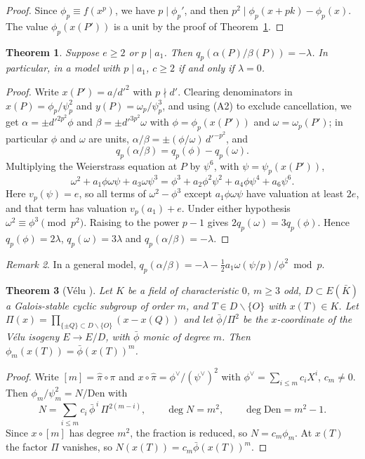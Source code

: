 \documentclass[11pt,a4paper]{amsart}
\newcommand{\qp}{q_p}
\theoremstyle{plain}
\newtheorem{theorem}{Theorem}[section]
\theoremstyle{definition}
\theoremstyle{remark}
\newtheorem{remark}[theorem]{Remark}
\begin{document}
\begin{proof}
Since $\phi_p\equiv f(x^p)$, we have $p\mid\phi_p'$, and then $p^2\mid\phi_p(x+pk)-\phi_p(x)$. The value $\phi_p(x(P'))$ is a unit by the proof of Theorem~\ref{thm:criterion}.
\end{proof}

\begin{theorem}\label{thm:criterion}
Suppose $e\ge2$ or $p\mid a_1$. Then $\qp(\alpha(P)/\beta(P))=-\lambda$. In particular, in a model with $p\mid a_1$, $c\ge2$ if and only if $\lambda=0$.
\end{theorem}

\begin{proof}
Write $x(P')=a/d'^2$ with $p\nmid d'$. Clearing denominators in $x(P)=\phi_p/\psi_p^2$ and $y(P)=\omega_p/\psi_p^3$, and using \textup{(A2)} to exclude cancellation, we get $\alpha=\pm d'^{2p^2}\phi$ and $\beta=\pm d'^{3p^2}\omega$ with $\phi=\phi_p(x(P'))$ and $\omega=\omega_p(P')$; in particular $\phi$ and $\omega$ are units, $\alpha/\beta=\pm(\phi/\omega)\,d'^{-p^2}$, and
\[
\qp(\alpha/\beta)=\qp(\phi)-\qp(\omega).
\]
Multiplying the Weierstrass equation at $P$ by $\psi^6$, with $\psi=\psi_p(x(P'))$,
\[
\omega^2+a_1\phi\omega\psi+a_3\omega\psi^3=\phi^3+a_2\phi^2\psi^2+a_4\phi\psi^4+a_6\psi^6 .
\]
Here $v_p(\psi)=e$, so all terms of $\omega^2-\phi^3$ except $a_1\phi\omega\psi$ have valuation at least $2e$, and that term has valuation $v_p(a_1)+e$. Under either hypothesis $\omega^2\equiv\phi^3\pmod{p^2}$. Raising to the power $p-1$ gives $2\qp(\omega)=3\qp(\phi)$. Hence $\qp(\phi)=2\lambda$, $\qp(\omega)=3\lambda$ and $\qp(\alpha/\beta)=-\lambda$.
\end{proof}

\begin{remark}
In a general model, $\qp(\alpha/\beta)=-\lambda-\frac12a_1\omega(\psi/p)/\phi^2\bmod p$.
\end{remark}

\begin{theorem}[{Vélu \cite{Vel}}]\label{thm:velu}
Let $K$ be a field of characteristic $0$, $m\ge3$ odd, $D\subset E(\bar K)$ a Galois-stable cyclic subgroup of order $m$, and $T\in D\smallsetminus\{O\}$ with $x(T)\in K$. Let $\Pi(x)=\prod_{\{\pm Q\}\subset D\smallsetminus\{O\}}(x-x(Q))$ and let $\bar\phi/\Pi^2$ be the $x$-coordinate of the Vélu isogeny $E\to E/D$, with $\bar\phi$ monic of degree $m$. Then $\phi_m(x(T))=\bar\phi(x(T))^m$.
\end{theorem}

\begin{proof}
Write $[m]=\hat\pi\circ\pi$ and $x\circ\hat\pi=\phi^\vee/(\psi^\vee)^2$ with $\phi^\vee=\sum_{i\le m}c_iX^i$, $c_m\ne0$. Then $\phi_m/\psi_m^2=N/\mathrm{Den}$ with
\[
N=\sum_{i\le m}c_i\,\bar\phi^{\,i}\,\Pi^{2(m-i)},\qquad\deg N=m^2,\qquad\deg\mathrm{Den}=m^2-1 .
\]
Since $x\circ[m]$ has degree $m^2$, the fraction is reduced, so $N=c_m\phi_m$. At $x(T)$ the factor $\Pi$ vanishes, so $N(x(T))=c_m\bar\phi(x(T))^m$.
\end{proof}
\end{document}
